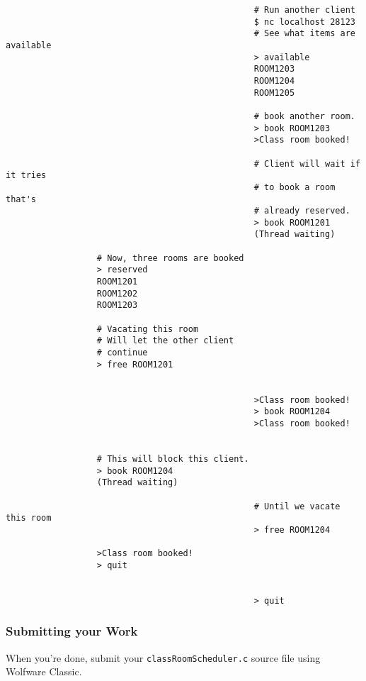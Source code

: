 \documentclass{article}
\begin{document}
\begin{enumerate}
\begin{verbatim}
                                                 # Run another client
                                                 $ nc localhost 28123
                                                 # See what items are available
                                                 > available
                                                 ROOM1203
                                                 ROOM1204
                                                 ROOM1205

                                                 # book another room.
                                                 > book ROOM1203
                                                 >Class room booked!

                                                 # Client will wait if it tries
                                                 # to book a room that's
                                                 # already reserved.
                                                 > book ROOM1201
                                                 (Thread waiting)

                  # Now, three rooms are booked
                  > reserved        
                  ROOM1201
                  ROOM1202
                  ROOM1203

                  # Vacating this room
                  # Will let the other client
                  # continue
                  > free ROOM1201


                                                 >Class room booked!
                                                 > book ROOM1204
                                                 >Class room booked!


                  # This will block this client.
                  > book ROOM1204
                  (Thread waiting)

                                                 # Until we vacate this room
                                                 > free ROOM1204
                
                  >Class room booked!                                 
                  > quit

                                 
                                                 > quit
\end{verbatim}

\subsubsection*{Submitting your Work}

When you're done, submit your \texttt{classRoomScheduler.c} source file using Wolfware Classic.
 


\end{enumerate}
\end{document}
